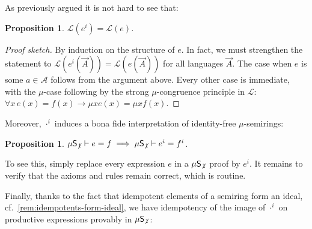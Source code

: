 \documentclass[a4paper,10pt]{amsart}
\newtheorem{proposition}[theorem]{Proposition}
\theoremstyle{definition}
\newcommand{\Alphabet}{\mathcal{A}}
\newcommand{\proves}{\vdash}
\newcommand{\Lang}{\mathcal L}
\newcommand{\lang}[1]{\Lang(#1)}
\newcommand{\id}{\mathsf{init}}
\newcommand{\limp}{\rightarrow}
\newcommand{\basicax}{\mu\mathsf{S}}
\newcommand{\basicaxidfree}{\basicax_{\not {\hspace{.1em}1}}}
\renewcommand{\id}[1]{#1^i}
\begin{document}
As previously argued it is not hard to see that:
\begin{proposition}
\label{idem-trans-equiv-in-lang}
    $\lang {\id e} = \lang {e}$.
\end{proposition}
\begin{proof}
[Proof sketch]
    By induction on the structure of $e$. In fact, we must strengthen the statement to $\lang {\id e(\vec A)} = \lang {e(\vec A)}$ for all languages $\vec A$.
    The case when $e$ is some $a \in \Alphabet$ follows from the argument above.
    Every other case is immediate, with the $\mu$-case following by the strong $\mu$-congruence principle in $\Lang$: $\forall x\,    e(x) =f(x) \limp \mu x e(x) = \mu x f(x)$.
\end{proof}

Moreover, $\id \cdot$ induces a bona fide interpretation of identity-free $\mu$-semirings:

\begin{proposition}
\label{idem-trans-is-an-interp}
    $\basicaxidfree\proves e=f \implies \basicaxidfree \proves \id e = \id f$.
\end{proposition}
\noindent
To see this, simply replace every expression $e $ in a $\basicaxidfree$ proof by $\id e$. It remains to verify that the axioms and rules remain correct, which is routine.




Finally, thanks to the fact that idempotent elements of a semiring form an ideal, cf.~\cref{rem:idempotents-form-ideal}, we have idempotency of the image of $\id \cdot $ on productive expressions provably in $\basicaxidfree$:
\end{document}
